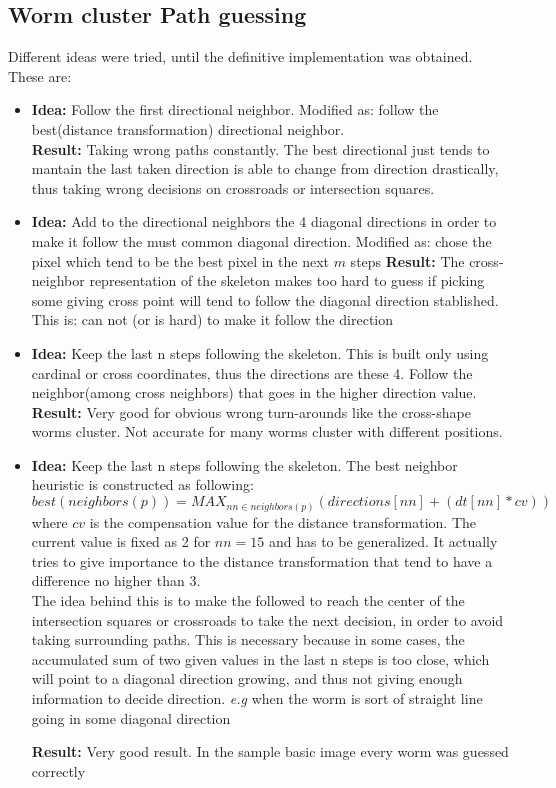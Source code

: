 \documentclass{article}
\begin{document}
\subsection{Worm cluster Path  guessing}

Different ideas were tried, until the definitive implementation was obtained. These are:
\begin{itemize}
\item \textbf{Idea: } Follow the first directional neighbor. Modified as: follow the best(distance transformation) directional neighbor.\\
  \textbf{Result: }Taking wrong paths constantly. The best directional just tends to mantain the last taken direction is able to change
  from direction drastically, thus taking wrong decisions on crossroads or intersection squares.

\item \textbf{Idea: } Add to the directional neighbors the 4 diagonal directions in order to make it follow the must common diagonal direction.
  Modified as: chose the pixel which tend to be the best pixel in the next $m$ steps
  \textbf{Result: } The cross-neighbor representation of the skeleton makes too hard to guess if picking some giving cross point will tend 
  to follow the diagonal direction stablished. This is: can not (or is hard) to make it follow the direction

\item \textbf{Idea: }Keep the last n steps following the skeleton. This is built only using cardinal or cross coordinates, thus the directions
  are these 4. Follow the neighbor(among cross neighbors) that goes in the higher direction value.\\
  \textbf{Result: } Very good for obvious wrong turn-arounds like the cross-shape worms cluster. Not accurate for many worms cluster with different
  positions.

\item \textbf{Idea: }Keep the last n steps following the skeleton. The best neighbor heuristic is constructed as following:
$$best(neighbors(p)) = MAX_{nn \in neighbors(p)}(directions[nn]+(dt[nn]*cv))$$ where $cv$ is the compensation value for the distance
transformation. The current value is fixed as 2 for $nn=15$ and has to be generalized. It actually tries to give importance to the distance
transformation that tend to have a difference no higher than 3.\\
The idea behind this is to make the followed to reach the center of the intersection squares or crossroads to take the next decision, in order to
avoid taking surrounding paths. This is necessary because in some cases, the accumulated sum of two given values in the last n steps is too close, which
will point to a diagonal direction growing, and thus not giving enough information to decide direction.
\emph{e.g} when the worm is sort of straight line going in some diagonal direction

\textbf{Result: }Very good result. In the sample basic image every worm was guessed correctly
\end{itemize}
\end{document}
